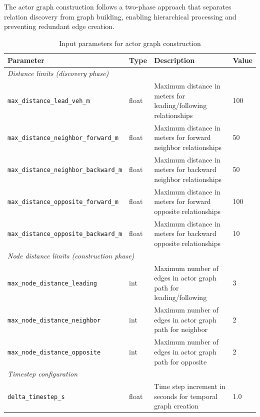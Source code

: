 The actor graph construction follows a two-phase approach that separates relation discovery from 
graph building, enabling hierarchical processing and preventing redundant edge creation.
\begin{table}[H]
      \centering
      \caption{Input parameters for actor graph construction}
      \label{tab:construction_parameters}
      \begin{tabular}{llp{6cm}l}
      \hline
      \textbf{Parameter} & \textbf{Type} & \textbf{Description} & \textbf{Value} \\
      \hline
      \multicolumn{4}{l}{\textit{Distance limits (discovery phase)}} \\
      \hline
      \texttt{max\_distance\_lead\_veh\_m} & float & Maximum distance in meters for leading/following 
      relationships & 100 \\
      \texttt{max\_distance\_neighbor\_forward\_m} & float & Maximum distance in meters for forward 
      neighbor relationships & 50 \\
      \texttt{max\_distance\_neighbor\_backward\_m} & float & Maximum distance in meters for backward 
      neighbor relationships & 50 \\
      \texttt{max\_distance\_opposite\_forward\_m} & float & Maximum distance in meters for forward 
      opposite relationships & 100 \\
      \texttt{max\_distance\_opposite\_backward\_m} & float & Maximum distance in meters for backward 
      opposite relationships & 10 \\
      \hline
      \multicolumn{4}{l}{\textit{Node distance limits (construction phase)}} \\
      \hline
      \texttt{max\_node\_distance\_leading} & int & Maximum number of edges in actor graph path for 
      leading/following & 3 \\
      \texttt{max\_node\_distance\_neighbor} & int & Maximum number of edges in actor graph path for 
      neighbor & 2 \\
      \texttt{max\_node\_distance\_opposite} & int & Maximum number of edges in actor graph path for 
      opposite & 2 \\
      \hline
      \multicolumn{4}{l}{\textit{Timestep configuration}} \\
      \hline
      \texttt{delta\_timestep\_s} & float & Time step increment in seconds for temporal graph 
      creation & 1.0 \\
      \hline
      \end{tabular}
      \end{table}

